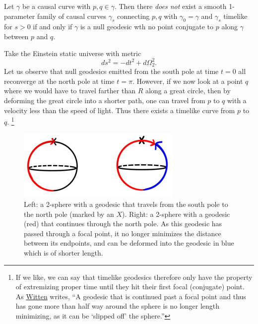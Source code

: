 \begin{thm}
    Let $\gamma$ be a causal curve with $p,q\in \gamma$. Then there \emph{does not} exist a smooth 1-parameter family of causal curves $\gamma_s$ connecting $p,q$ with $\gamma_0=\gamma$ and $\gamma_s$ timelike for $s>0$ if and only if $\gamma$ is a null geodesic wth no point conjugate to $p$ along $\gamma$ between $p$ and $q$.
\end{thm}

\begin{exm}
    Take the Einstein static universe with metric 
    \begin{equation*}
        ds^2=-dt^2+d\Omega_2^2.
    \end{equation*}
    Let us observe that null geodesics emitted from the south pole at time $t=0$ all reconverge at the north pole at time $t=\pi$. 
    However, if we now look at a point $q$ where we would have to travel farther than $R$ along a great circle, then by deforming the great circle into a shorter path, one can travel from $p$ to $q$ with a velocity less than the speed of light. Thus there exists a timelike curve from $p$ to $q.$%
        \footnote{If we like, we can say that timelike geodesics therefore only have the property of extremizing proper time until they hit their first focal (conjugate) point. As \href{https://arxiv.org/pdf/1901.03928.pdf}{Witten} writes, ``A geodesic that is continued past a focal point and thus has gone more than half way around the sphere is no longer length minimizing, as it can be `slipped off' the sphere.''}
\end{exm}
\begin{figure}
    \centering
    \includegraphics{2019/02/20190221_greatcirclegeodesics.png}
    \caption{Left: a 2-sphere with a geodesic that travels from the south pole to the north pole (marked by an $X$). Right: a 2-sphere with a geodesic (red) that continues through the north pole. As this geodesic has passed through a focal point, it no longer minimizes the distance between its endpoints, and can be deformed into the geodesic in blue which is of shorter length.}
    \label{fig:greatcirclegeodesics}
\end{figure}


